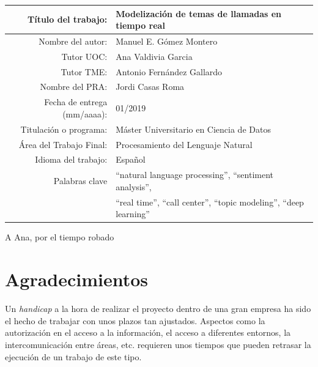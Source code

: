 \begin{table}[ht]
	\centering{}
	\renewcommand{\arraystretch}{2}
	\begin{tabular}{r | l}
		\hline
		Título del trabajo: &  Modelización de temas de llamadas en tiempo real\\
		\hline
       Nombre del autor: & Manuel E. Gómez Montero\\
		\hline
        Tutor UOC: & Ana Valdivia Garcia\\
		\hline
		Tutor TME: & Antonio Fernández Gallardo\\
		\hline
        Nombre del PRA: & Jordi Casas Roma\\
		\hline
        Fecha de entrega (mm/aaaa): & 01/2019\\
		\hline
        Titulación o programa: & Máster Universitario en Ciencia de Datos\\
		\hline
        Área del Trabajo Final: & Procesamiento del Lenguaje Natural\\
		\hline
        Idioma del trabajo: & Español\\
		\hline
        Palabras clave & ``natural language processing'', ``sentiment analysis'',\\
        & ``real time'', ``call center'', ``topic modeling'', ``deep learning''\\
		\hline
	\end{tabular}
\end{table}


\cleardoublepage
\begin{dedication}
A Ana, por el tiempo robado
\end{dedication}
\cleardoublepage
\chapter*{Agradecimientos}


Un \textit{handicap} a la hora de realizar el proyecto dentro de una gran empresa ha sido el hecho de trabajar con unos plazos tan ajustados. Aspectos como la autorización en el acceso a la información, el acceso a diferentes entornos, la intercomunicación entre áreas, etc. requieren unos tiempos que pueden retrasar la ejecución de un trabajo de este tipo. 
 
